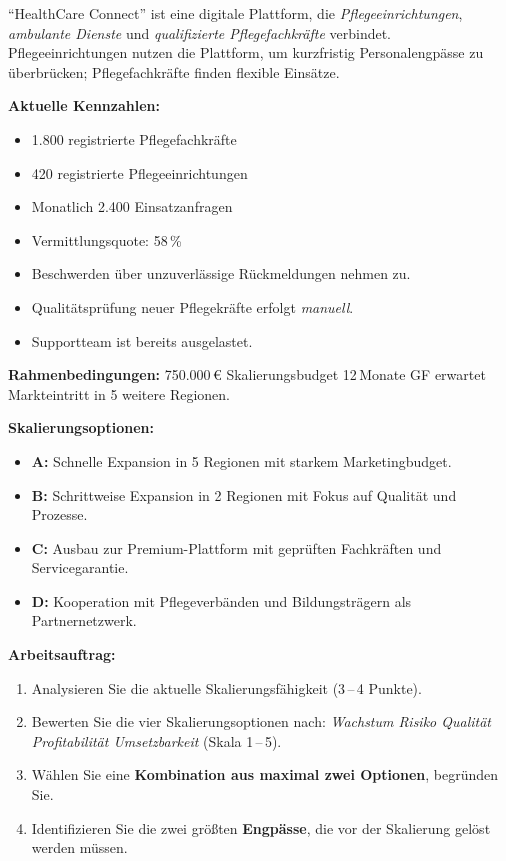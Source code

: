 \documentclass[11pt,a4paper,oneside]{article}
\begin{document}
\begin{infobox}
``HealthCare Connect'' ist eine digitale Plattform, die \emph{Pflegeeinrichtungen}, \emph{ambulante Dienste} und \emph{qualifizierte Pflegefachkräfte} verbindet. Pflegeeinrichtungen nutzen die Plattform, um kurzfristig Personalengpässe zu überbrücken; Pflegefachkräfte finden flexible Einsätze.

\smallskip
\textbf{Aktuelle Kennzahlen:}
\begin{itemize}
  \item 1.800 registrierte Pflegefachkräfte
  \item 420 registrierte Pflegeeinrichtungen
  \item Monatlich 2.400 Einsatzanfragen
  \item Vermittlungsquote: 58\,\%
  \item Beschwerden über unzuverlässige Rückmeldungen nehmen zu.
  \item Qualitätsprüfung neuer Pflegekräfte erfolgt \emph{manuell}.
  \item Supportteam ist bereits ausgelastet.
\end{itemize}

\smallskip
\textbf{Rahmenbedingungen:} 750.000\,\euro{} Skalierungsbudget \textperiodcentered{} 12\,Monate \textperiodcentered{} GF erwartet Markteintritt in 5 weitere Regionen.

\smallskip
\textbf{Skalierungsoptionen:}
\begin{itemize}
  \item \textbf{A:} Schnelle Expansion in 5 Regionen mit starkem Marketingbudget.
  \item \textbf{B:} Schrittweise Expansion in 2 Regionen mit Fokus auf Qualität und Prozesse.
  \item \textbf{C:} Ausbau zur Premium-Plattform mit geprüften Fachkräften und Servicegarantie.
  \item \textbf{D:} Kooperation mit Pflegeverbänden und Bildungsträgern als Partnernetzwerk.
\end{itemize}
\end{infobox}

\noindent\textbf{Arbeitsauftrag:}

\begin{enumerate}
  \item Analysieren Sie die aktuelle Skalierungsfähigkeit (3\,--\,4 Punkte).
  \item Bewerten Sie die vier Skalierungsoptionen nach: \emph{Wachstum \textperiodcentered{} Risiko \textperiodcentered{} Qualität \textperiodcentered{} Profitabilität \textperiodcentered{} Umsetzbarkeit} (Skala 1\,--\,5).
  \item Wählen Sie eine \textbf{Kombination aus maximal zwei Optionen}, begründen Sie.
  \item Identifizieren Sie die zwei größten \textbf{Engpässe}, die vor der Skalierung gelöst werden müssen.
\end{enumerate}
\end{document}
